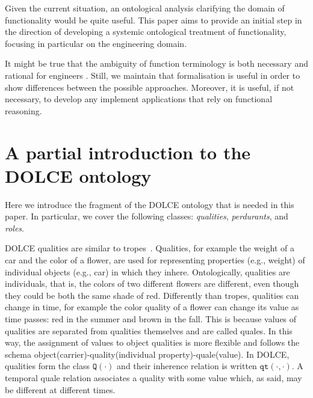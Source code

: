\documentclass[sw]{iosart2x}
\newcommand{\generalStyle}[1]{\texttt{#1}}
\newcommand{\biRel}[3]{\generalStyle{#1}(#2,#3)}
\newcommand{\uniRel}[2]{\generalStyle{#1}(#2)}
\newcommand{\DOLCE}{\textsc{DOLCE}\xspace} %
\newcommand{\DOLCEQuality}[1]{\uniRel{Q}{#1}}
\newcommand{\DOLCEQualityDirect}[2]{\biRel{qt}{#1}{#2}}
\newcommand{\firstTimeKeyWord}[1]{\textit{#1}}
\newcommand{\TODO}[1]{{\color{red} #1}}
\newcommand{\TODOinline}[1]{{\color{red} #1}}
\begin{document}
Given the current situation, an ontological analysis clarifying the domain of functionality would be quite useful.
This paper aims to provide an initial step in the direction of developing a systemic ontological treatment of functionality, focusing in particular on the engineering domain.

It might be true that the ambiguity of function terminology is both necessary and rational for engineers \cite{vermaasConceptualElusivenessEngineering2012}. 
Still, we maintain that formalisation is useful in order to show differences between the possible approaches. Moreover, it is useful, if not necessary, to develop any implement applications that rely on functional reasoning.






\section{A partial introduction to the \DOLCE ontology\label{sec:DOLCE}} 
Here we introduce the fragment of the \DOLCE ontology \cite{masoloWonderWebDeliverableD182003,borgoDOLCEDescriptiveOntology2022} that is needed in this paper. In particular, we cover the following classes: \firstTimeKeyWord{qualities}, \firstTimeKeyWord{perdurants}, and \firstTimeKeyWord{roles}. 

\DOLCE qualities are similar to tropes~\cite{Campbell90}. Qualities, for example the weight of a car and the color of a flower, are used for representing properties (e.g., weight) of individual objects (e.g., car) in which they inhere.
Ontologically, qualities are individuals, that is, the colors of two different flowers are different, even though they could be both the same shade of red.
Differently than tropes, qualities can change in time, for example the color quality of a flower can change its value as time passes: red in the summer and brown in the fall.
This is because values of qualities are separated from qualities themselves and are called quales. 
In this way, the assignment of values to object qualities is more flexible and follows the schema object(carrier)-quality(individual property)-quale(value).
In \DOLCE, qualities form the class $\DOLCEQuality{\cdot}$ and their inherence relation is written $\DOLCEQualityDirect{\cdot}{\cdot}$. A temporal quale relation associates a quality with some value which, as said, may be different at different times. 
\end{document}
